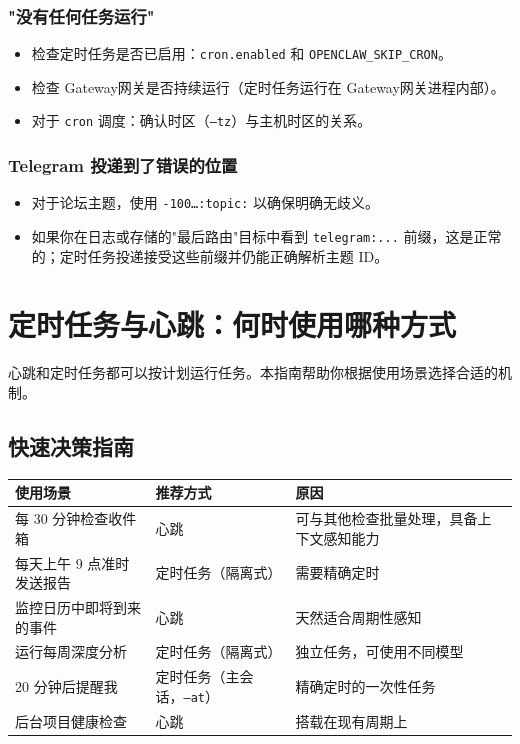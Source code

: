 \subsubsection{"没有任何任务运行"}


\begin{itemize}
  \item 检查定时任务是否已启用：\texttt{cron.enabled} 和 \texttt{OPENCLAW\_SKIP\_CRON}。
  \item 检查 Gateway网关是否持续运行（定时任务运行在 Gateway网关进程内部）。
  \item 对于 \texttt{cron} 调度：确认时区（\texttt{--tz}）与主机时区的关系。
\end{itemize}


\subsubsection{Telegram 投递到了错误的位置}


\begin{itemize}
  \item 对于论坛主题，使用 \texttt{-100…:topic:} 以确保明确无歧义。
  \item 如果你在日志或存储的"最后路由"目标中看到 \texttt{telegram:...} 前缀，这是正常的；定时任务投递接受这些前缀并仍能正确解析主题 ID。
\end{itemize}



\clearpage

\section{定时任务与心跳：何时使用哪种方式}


心跳和定时任务都可以按计划运行任务。本指南帮助你根据使用场景选择合适的机制。

\subsection{快速决策指南}



\begin{table}[h]
\centering
\small
\begin{tabular}{|l|l|l|}
\hline
使用场景 & 推荐方式 & 原因 \\
\hline
每 30 分钟检查收件箱 & 心跳 & 可与其他检查批量处理，具备上下文感知能力 \\
\hline
每天上午 9 点准时发送报告 & 定时任务（隔离式） & 需要精确定时 \\
\hline
监控日历中即将到来的事件 & 心跳 & 天然适合周期性感知 \\
\hline
运行每周深度分析 & 定时任务（隔离式） & 独立任务，可使用不同模型 \\
\hline
20 分钟后提醒我 & 定时任务（主会话，\texttt{--at}） & 精确定时的一次性任务 \\
\hline
后台项目健康检查 & 心跳 & 搭载在现有周期上 \\
\hline
\end{tabular}
\end{table}




